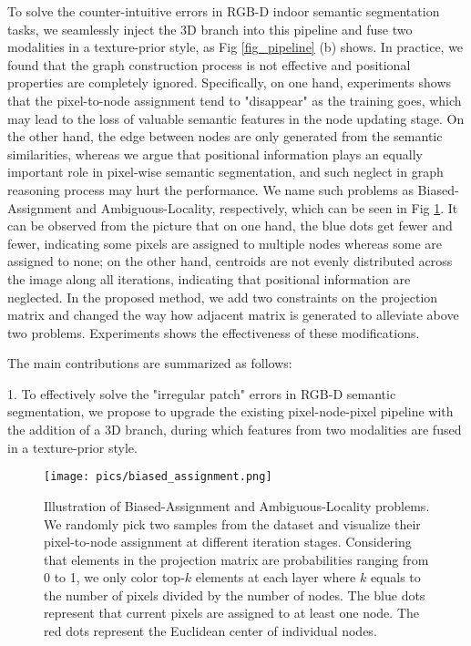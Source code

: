 ﻿\documentclass[journal]{IEEEtran}
\begin{document}
    
    
    To solve the counter-intuitive errors in RGB-D indoor semantic segmentation tasks, we seamlessly inject the 3D branch into this pipeline and fuse two modalities in a texture-prior style, as Fig \ref{fig_pipeline} (b) shows. In practice, we found that the graph construction process is not effective and positional properties are completely ignored. Specifically, on one hand, experiments shows that the pixel-to-node assignment tend to "disappear" as the training goes, which may lead to the loss of valuable semantic features in the node updating stage. On the other hand, the edge between nodes are only generated from the semantic similarities, whereas we argue that positional information plays an equally important role in pixel-wise semantic segmentation, and such neglect in graph reasoning process may hurt the performance. We name such problems as Biased-Assignment and Ambiguous-Locality, respectively, which can be seen in Fig \ref{fig_blue_red}. It can be observed from the picture that on one hand, the blue dots get fewer and fewer, indicating some pixels are assigned to multiple nodes whereas some are assigned to none; on the other hand, centroids are not evenly distributed across the image along all iterations, indicating that positional information are neglected. In the proposed method, we add two constraints on the projection matrix and changed the way how adjacent matrix is generated to alleviate above two problems. Experiments shows the effectiveness of these modifications. 

    The main contributions are summarized as follows: 

    1. To effectively solve the "irregular patch" errors in RGB-D semantic segmentation, we propose to upgrade the existing pixel-node-pixel pipeline with the addition of a 3D branch, during which features from two modalities are fused in a texture-prior style.

    

\begin{figure}
    \centering
    \texttt{[image: pics/biased\_assignment.png]}
    \caption{Illustration of Biased-Assignment and Ambiguous-Locality problems. We randomly pick two samples from the dataset and visualize their pixel-to-node assignment at different iteration stages. Considering that elements in the projection matrix are probabilities ranging from 0 to 1, we only color top-$k$ elements at each layer where $k$ equals to the number of pixels divided by the number of nodes. The blue dots represent that current pixels are assigned to at least one node. The red dots represent the Euclidean center of individual nodes. }
    \label{fig_blue_red}
\end{figure}
    
\end{document}
